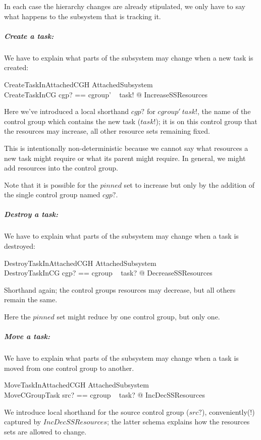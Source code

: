 \documentclass[a4paper,twoside,12pt]{article}
\begin{document}
In each case the hierarchy changes are already stipulated, we only have to say what happens to the subsystem that is
tracking it.

\subparagraph{Create a task:}
We have to explain what parts of the subsystem may change when a new task is created:

\begin{schema}{CreateTaskInAttachedCGH}
\Delta AttachedSubsystem \\
CreateTaskInCG
\where
\LET cgp? == cgroup' ~ task! @ IncreaseSSResources
\end{schema}
Here we've introduced a local shorthand $cgp?$ for $cgroup' ~ task!$, the name of the control group which contains
the new task ($task!$); it is on this control group that the resources may increase, all other resource sets
remaining fixed.

This is intentionally non-deterministic because we cannot say what resources a new task might require or
what its parent might require. In general, we might add resources into the control group.

Note that it is possible for the $pinned$ set to increase but only by the addition of the single control group
named $cgp?$.

\subparagraph{Destroy a task:}
We have to explain what parts of the subsystem may change when a task is destroyed:

\begin{schema}{DestroyTaskInAttachedCGH}
\Delta AttachedSubsystem \\
DestroyTaskInCG
\where
\LET cgp? == cgroup ~ task? @ DecreaseSSResources
\end{schema}
Shorthand again;  the control groups resources may decrease, but all others remain the same.

Here the $pinned$ set might reduce by one control group, but only one.

\subparagraph{Move a task:}
We have to explain what parts of the subsystem may change when a task is moved from one control group to another.

\begin{schema}{MoveTaskInAttachedCGH}
\Delta AttachedSubsystem \\
MoveCGroupTask
\where
\LET src? == cgroup ~ task? @ IncDecSSResources
\end{schema}
We introduce local shorthand for the source control group ($src?$), conveniently(!) captured by $IncDecSSResources$;
the latter schema explains how the resources sets are allowed to change.
\end{document}
